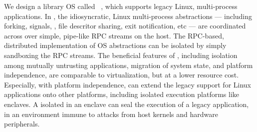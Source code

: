 We design a library OS called \graphene{}~\cite{tsai14graphene},
which supports legacy Linux, multi-process applications.
In \graphene{},
the idiosyncratic, Linux multi-process abstractions
--- including forking, signals, \sysvipc{}, file descritor sharing, exit notification, etc
--- are coordinated across \picoprocs{}
over simple, pipe-like RPC streams on the host.
The RPC-based, distributed implementation of OS abstractions
can be isolated by simply sandboxing the RPC streams.
The beneficial features of \graphene{}, %
including isolation among mutually untrusting applications,
migration of system state,
and platform independence,
are comparable to virtualization,
but at a lower resource cost.
Especially, with platform independence, \graphene{}
can extend
the legacy support for Linux applications
onto other platforms,
including isolated execution platforms like \intel{} \sgx{} enclaves.
A \graphene{} \picoproc{} isolated in an enclave
can seal the execution of a legacy application,
in an environment immune to attacks from host kernels
and hardware peripherals.




